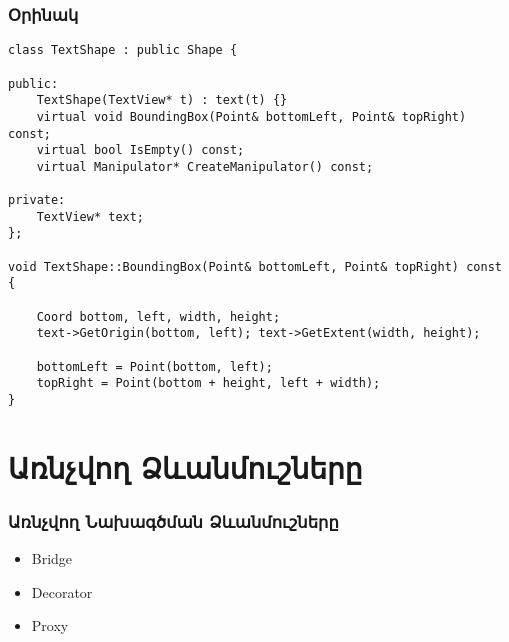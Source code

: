\documentclass{beamer}
\begin{document}
\begin{frame}[fragile]\frametitle{Օրինակ}
\begin{english}
\begin{verbatim}
class TextShape : public Shape {

public:
    TextShape(TextView* t) : text(t) {}
    virtual void BoundingBox(Point& bottomLeft, Point& topRight) const;
    virtual bool IsEmpty() const;
    virtual Manipulator* CreateManipulator() const;

private:
    TextView* text;
};

void TextShape::BoundingBox(Point& bottomLeft, Point& topRight) const {

    Coord bottom, left, width, height;
    text->GetOrigin(bottom, left); text->GetExtent(width, height);

    bottomLeft = Point(bottom, left);
    topRight = Point(bottom + height, left + width);
}
\end{verbatim}
\end{english}
\end{frame}

\section{Առնչվող Ձևանմուշները}
\begin{frame}\frametitle{Առնչվող Նախագծման Ձևանմուշները}
\begin{itemize}
    \item Bridge \vfill
    \item Decorator \vfill
    \item Proxy
\end{itemize}
\end{frame}
\end{document}
